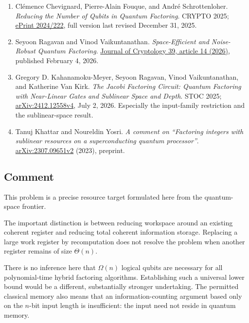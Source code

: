 \begin{enumerate}[label={},leftmargin=4.8em,labelsep=0.5em]
  \footnotesize
  \item[\textup{[Chevignard25]}]\label{ref:3300-chevignard25}
  Clémence Chevignard, Pierre-Alain Fouque, and André Schrottenloher. \emph{Reducing the Number of Qubits in Quantum Factoring}. CRYPTO 2025; \href{https://eprint.iacr.org/2024/222}{ePrint 2024/222}, full version last revised December 31, 2025.

  \item[\textup{[Ragavan26]}]\label{ref:3300-ragavan26}
  Seyoon Ragavan and Vinod Vaikuntanathan. \emph{Space-Efficient and Noise-Robust Quantum Factoring}. \href{https://link.springer.com/article/10.1007/s00145-026-09572-x}{Journal of Cryptology 39, article 14 (2026)}, published February 4, 2026.

  \item[\textup{[KahanamokuMeyer25]}]\label{ref:3300-kahanamokumeyer25}
  Gregory D. Kahanamoku-Meyer, Seyoon Ragavan, Vinod Vaikuntanathan, and Katherine Van Kirk. \emph{The Jacobi Factoring Circuit: Quantum Factoring with Near-Linear Gates and Sublinear Space and Depth}. STOC 2025; \href{https://arxiv.org/abs/2412.12558v4}{arXiv:2412.12558v4}, July 2, 2026. Especially the input-family restriction and the sublinear-space result.

  \item[\textup{[Khattar23]}]\label{ref:3300-khattar23}
  Tanuj Khattar and Noureldin Yosri. \emph{A comment on “Factoring integers with sublinear resources on a superconducting quantum processor”}. \href{https://arxiv.org/abs/2307.09651v2}{arXiv:2307.09651v2} (2023), preprint.
\end{enumerate}

\subsection*{Comment}

This problem is a precise resource target formulated here from the quantum-space frontier.

The important distinction is between reducing workspace around an existing coherent register and reducing total coherent information storage. Replacing a large work register by recomputation does not resolve the problem when another register remains of size $\Theta(n)$.

There is no inference here that $\Omega(n)$ logical qubits are necessary for all polynomial-time hybrid factoring algorithms. Establishing such a universal lower bound would be a different, substantially stronger undertaking. The permitted classical memory also means that an information-counting argument based only on the $n$-bit input length is insufficient: the input need not reside in quantum memory.

